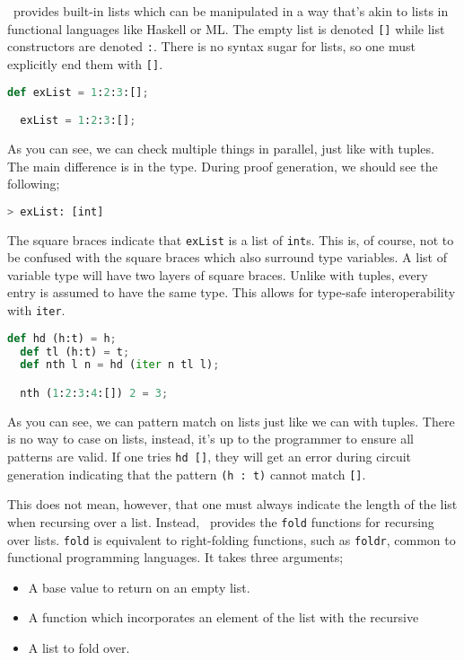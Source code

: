 \vampir\ provides built-in lists which can be manipulated in a way that's akin to lists in functional languages like Haskell or ML. The empty list is denoted \lstinline{[]} while list constructors are denoted \lstinline{:}. There is no syntax sugar for lists, so one must explicitly end them with \lstinline{[]}.

\begin{lstlisting}[language=Python]
  def exList = 1:2:3:[];

  exList = 1:2:3:[];
\end{lstlisting}

As you can see, we can check multiple things in parallel, just like with tuples. The main difference is in the type. During proof generation, we should see the following;

\begin{lstlisting}[language=bash]
  > exList: [int]
\end{lstlisting}

The square braces indicate that \lstinline{exList} is a list of \lstinline{int}s. This is, of course, not to be confused with the square braces which also surround type variables. A list of variable type will have two layers of square braces. Unlike with tuples, every entry is assumed to have the same type. This allows for type-safe interoperability with \lstinline{iter}.

\begin{lstlisting}[language=Python]
  def hd (h:t) = h;
  def tl (h:t) = t;
  def nth l n = hd (iter n tl l);

  nth (1:2:3:4:[]) 2 = 3;
\end{lstlisting}

As you can see, we can pattern match on lists just like we can with tuples. There is no way to case on lists, instead, it's up to the programmer to ensure all patterns are valid. If one tries \lstinline{hd []}, they will get an error during circuit generation indicating that the pattern \lstinline{(h : t)} cannot match \lstinline{[]}.

This does not mean, however, that one must always indicate the length of the list when recursing over a list. Instead, \vampir\ provides the \lstinline{fold} functions for recursing over lists. \lstinline{fold} is equivalent to right-folding functions, such as \lstinline{foldr}, common to functional programming languages. It takes three arguments;


\begin{itemize}
\item A base value to return on an empty list.
\item A function which incorporates an element of the list with the recursive 
\item A list to fold over.
\end{itemize}

